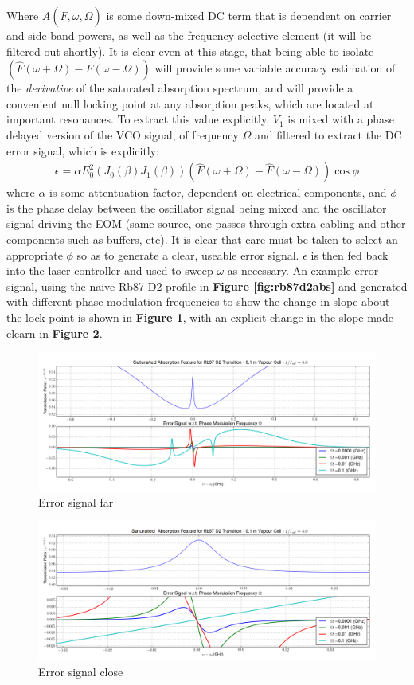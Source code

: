 Where  $A(\hat{F}, \omega, \Omega)$ is some down-mixed DC term that is dependent
on carrier and side-band powers, as well as the frequency selective element
(it will be filtered out shortly). It is clear even at this stage, that being
able to isolate $(\hat{F}(\omega + \Omega) - \hat{F}(\omega - \Omega))$ will
provide some variable accuracy estimation of the \emph{derivative} of the
saturated absorption spectrum, and will provide a convenient null locking point
at any absorption peaks, which are located at important resonances. To extract
this value explicitly, $V_1$ is mixed with a phase delayed version of the
VCO signal, of frequency $\Omega$ and filtered to extract the DC error signal,
which is explicitly:
\begin{gather}
  \epsilon = \alpha E_0^2 (J_0(\beta)J_1(\beta))
    (\hat{F}(\omega + \Omega) - \hat{F}(\omega - \Omega))\cos\phi
\end{gather}
where $\alpha$ is some attentuation factor, dependent on electrical components,
and $\phi$ is the phase delay between the oscillator signal being mixed
and the oscillator signal driving the EOM (same source, one passes through
extra cabling and other components such as buffers, etc). It is clear that
care must be taken to select an appropriate $\phi$ so as to generate a
clear, useable error signal. $\epsilon$ is then fed back into the
laser controller and used to sweep $\omega$ as necessary.
An example error signal, using the naive Rb87 D2 profile in
\textbf{Figure \ref{fig:rb87d2abs}} and generated with different phase modulation
frequencies to show the change in slope about the lock point is shown in
\textbf{Figure \ref{fig:error_far}}, with an explicit change in the slope
made clearn in \textbf{Figure \ref{fig:error_close}}.

\begin{figure}
  \centering
  \includegraphics[width=\linewidth]{rb_D2_error_faraway.png}
  \caption{Error signal far}
    \label{fig:error_far}
\end{figure}

\begin{figure}
  \centering
  \includegraphics[width=\linewidth]{rb_D2_error_closer.png}
  \caption{Error signal close}
    \label{fig:error_close}
\end{figure}

